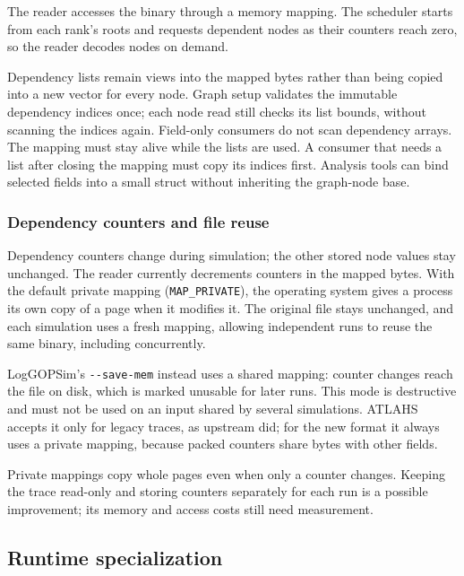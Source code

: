 \documentclass[10pt,a4paper]{article}
\begin{document}
The reader accesses the binary through a memory mapping. The scheduler starts from each rank's roots and requests dependent nodes as their counters reach zero, so the reader decodes nodes on demand.

Dependency lists remain views into the mapped bytes rather than being copied into a new vector for every node. Graph setup validates the immutable dependency indices once; each node read still checks its list bounds, without scanning the indices again. Field-only consumers do not scan dependency arrays. The mapping must stay alive while the lists are used. A consumer that needs a list after closing the mapping must copy its indices first. Analysis tools can bind selected fields into a small struct without inheriting the graph-node base.

\hypertarget{dependency-counters-and-file-reuse}{}
\subsubsection{Dependency counters and file reuse}

Dependency counters change during simulation; the other stored node values stay unchanged. The reader currently decrements counters in the mapped bytes. With the default private mapping (\texttt{MAP\_\allowbreak{}PRIVATE}), the operating system gives a process its own copy of a page when it modifies it. The original file stays unchanged, and each simulation uses a fresh mapping, allowing independent runs to reuse the same binary, including concurrently.

LogGOPSim's \texttt{-\allowbreak{}-\allowbreak{}save-\allowbreak{}mem} instead uses a shared mapping: counter changes reach the file on disk, which is marked unusable for later runs. This mode is destructive and must not be used on an input shared by several simulations. ATLAHS accepts it only for legacy traces, as upstream did; for the new format it always uses a private mapping, because packed counters share bytes with other fields.

Private mappings copy whole pages even when only a counter changes. Keeping the trace read-only and storing counters separately for each run is a possible improvement; its memory and access costs still need measurement.


\hypertarget{runtime-specialization}{}
\subsection{Runtime specialization}
\end{document}

